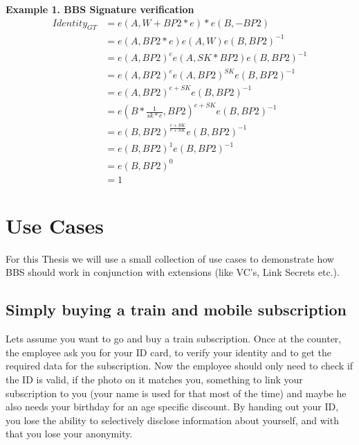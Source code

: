\documentclass[
	a4paper               %
	,bibliography=totoc   %
	,listof=totoc         %
	,monolingual
]{bfhthesis}              %
\begin{document}
\textbf{Example 1. BBS Signature verification}
\begin{equation}
	\begin{split}
		Identity_{GT} & = e(A, W + BP2 * e) * e(B, -BP2) \\
		& = e(A, BP2 * e)e(A, W)e(B, BP2)^{-1} \\
		& = e(A, BP2)^ee(A, SK * BP2)e(B, BP2)^{-1} \\
		& = e(A, BP2)^ee(A, BP2)^{SK}e(B, BP2)^{-1} \\
		& = e(A, BP2)^{e + SK}e(B, BP2)^{-1} \\
		& = e(B * \frac{1}{sk * e}, BP2)^{e + SK}e(B, BP2)^{-1} \\
		& = e(B, BP2)^{\frac{e + SK}{e + SK}}e(B, BP2)^{-1} \\
		& = e(B, BP2)^1e(B, BP2)^{-1} \\
		& = e(B, BP2)^0 \\
		& = 1
	\end{split}
\end{equation}

\chapter{Use Cases}
For this Thesis we will use a small collection of use cases to demonstrate how BBS should work in conjunction with extensions (like VC's, Link Secrets etc.).

\section{Simply buying a train and mobile subscription}
Lets assume you want to go and buy a train subscription.
Once at the counter, the employee ask you for your ID card, to verify your identity and to get the required data for the subscription.
Now the employee should only need to check if the ID is valid, if the photo on it matches you, something to link your subscription to you (your name is used for that most of the time) and maybe he also needs your birthday for an age specific discount.
By handing out your ID, you lose the ability to selectively disclose information about yourself, and with that you lose your anonymity.
\end{document}
